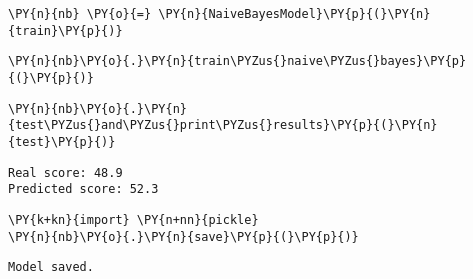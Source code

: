 \documentclass[11pt]{article}
\begin{document}
    \begin{tcolorbox}[breakable, size=fbox, boxrule=1pt, pad at break*=1mm,colback=cellbackground, colframe=cellborder]
\begin{Verbatim}[commandchars=\\\{\}]
\PY{n}{nb} \PY{o}{=} \PY{n}{NaiveBayesModel}\PY{p}{(}\PY{n}{train}\PY{p}{)}
\end{Verbatim}
\end{tcolorbox}

    \begin{tcolorbox}[breakable, size=fbox, boxrule=1pt, pad at break*=1mm,colback=cellbackground, colframe=cellborder]
\begin{Verbatim}[commandchars=\\\{\}]
\PY{n}{nb}\PY{o}{.}\PY{n}{train\PYZus{}naive\PYZus{}bayes}\PY{p}{(}\PY{p}{)}
\end{Verbatim}
\end{tcolorbox}

    \begin{tcolorbox}[breakable, size=fbox, boxrule=1pt, pad at break*=1mm,colback=cellbackground, colframe=cellborder]
\begin{Verbatim}[commandchars=\\\{\}]
\PY{n}{nb}\PY{o}{.}\PY{n}{test\PYZus{}and\PYZus{}print\PYZus{}results}\PY{p}{(}\PY{n}{test}\PY{p}{)}
\end{Verbatim}
\end{tcolorbox}

    \begin{Verbatim}[commandchars=\\\{\}]
Real score: 48.9
Predicted score: 52.3
    \end{Verbatim}

    \begin{tcolorbox}[breakable, size=fbox, boxrule=1pt, pad at break*=1mm,colback=cellbackground, colframe=cellborder]
\begin{Verbatim}[commandchars=\\\{\}]
\PY{k+kn}{import} \PY{n+nn}{pickle}
\PY{n}{nb}\PY{o}{.}\PY{n}{save}\PY{p}{(}\PY{p}{)}
\end{Verbatim}
\end{tcolorbox}

    \begin{Verbatim}[commandchars=\\\{\}]
Model saved.
    \end{Verbatim}
\end{document}
